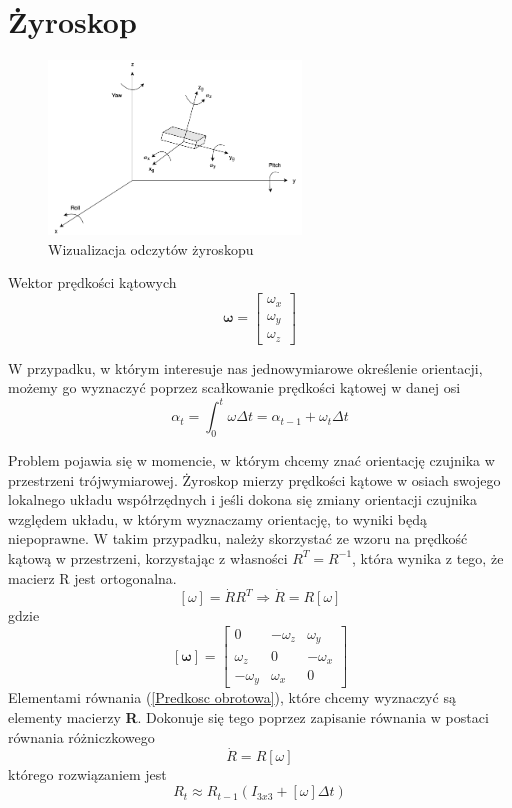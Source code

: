 \section{Żyroskop}

\begin{figure}[!htb]
    \centering
    \includegraphics[width=0.6\textwidth]{Rysunki/Rozdzial03/Zyroskop.png}
    \caption{Wizualizacja odczytów żyroskopu}
\end{figure}

Wektor prędkości kątowych
$$
    \mathbf{\omega} = 
    \left[
    \begin{array}{c}
        \omega_x \\
        \omega_y \\
        \omega_z
    \end{array}
    \right]
$$

W przypadku, w którym interesuje nas jednowymiarowe określenie orientacji, możemy go wyznaczyć poprzez scałkowanie prędkości kątowej w danej osi \cite{Akwizycja}
$$
    \alpha_t = \int_{0}^{t} \omega \Delta t = \alpha_{t-1} + \omega_t \Delta t
$$

Problem pojawia się w momencie, w którym chcemy znać orientację czujnika w przestrzeni trójwymiarowej. Żyroskop mierzy prędkości kątowe w osiach swojego lokalnego układu współrzędnych i jeśli dokona się zmiany orientacji czujnika względem układu, w którym wyznaczamy orientację, to wyniki będą niepoprawne. W takim przypadku, należy skorzystać ze wzoru na prędkość kątową w przestrzeni, korzystając z własności $R^T=R^{-1}$, która wynika z tego, że macierz R jest ortogonalna.
\begin{equation}
    \left[\omega\right] = \dot{R}R^T \Rightarrow \dot{R} = R \left[\omega\right]
    \label{Predkosc obrotowa}
\end{equation}
gdzie
$$
    \mathbf{\left[\omega\right]} = 
    \left[
    \begin{array}{ccc}
        0 & -\omega_z & \omega_y \\
        \omega_z & 0 & -\omega_x \\
        -\omega_y & \omega_x & 0
    \end{array}
    \right]
$$
Elementami równania (\ref{Predkosc obrotowa}), które chcemy wyznaczyć są elementy macierzy \textbf{R}. Dokonuje się tego poprzez zapisanie równania w postaci równania różniczkowego
$$
\dot{R} = R\left[\omega\right]
$$
którego rozwiązaniem jest
$$
    R_t \approx R_{t-1}(I_{3x3}+\left[\omega\right] \Delta t)
$$

